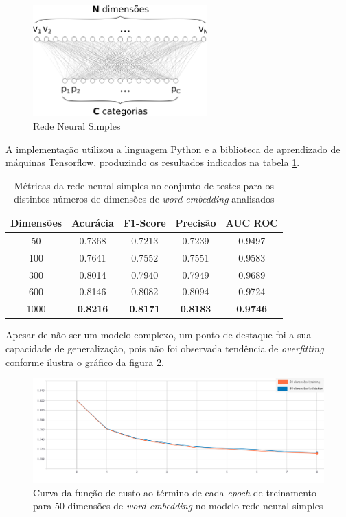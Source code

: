\begin{figure}[!ht]
	\centering
	\includegraphics[width=0.6\textwidth]{figures/simple_avg.png}
	\caption{Rede Neural Simples}
	\label{fig:simple_nn}
\end{figure}

A implementação utilizou a linguagem Python e a biblioteca de aprendizado de máquinas Tensorflow, produzindo os resultados indicados na tabela \ref{tab:simple_avg}.

\begin{table}[ht]
\centering
\caption{Métricas da rede neural simples no conjunto de testes para os distintos números de dimensões de \textit{word embedding} analisados}
\vspace{0.5cm}
\begin{tabular}{c|c|c|c|c}
 
Dimensões & Acurácia & F1-Score & Precisão & AUC ROC\\
\hline
50   & 0.7368 & 0.7213 & 0.7239 & 0.9497\\
100  & 0.7641 & 0.7552 & 0.7551 & 0.9583\\
300  & 0.8014 & 0.7940 & 0.7949 & 0.9689\\
600  & 0.8146 & 0.8082 & 0.8094 & 0.9724\\
1000 & \textbf{0.8216} & \textbf{0.8171} & \textbf{0.8183} & \textbf{0.9746}
\end{tabular}
\label{tab:simple_avg}
\end{table}

Apesar de não ser um modelo complexo, um ponto de destaque foi a sua capacidade de generalização, pois não foi observada tendência de \textit{overfitting} conforme ilustra o gráfico da figura \ref{fig:loss_50}.

\begin{figure}[!ht]
	\centering
	\includegraphics[width=1.1\textwidth]{figures/loss-50.PNG}
	\caption{Curva da função de custo ao término de cada \textit{epoch} de treinamento para 50 dimensões de \textit{word embedding} no modelo rede neural simples}
	\label{fig:loss_50}
\end{figure}

